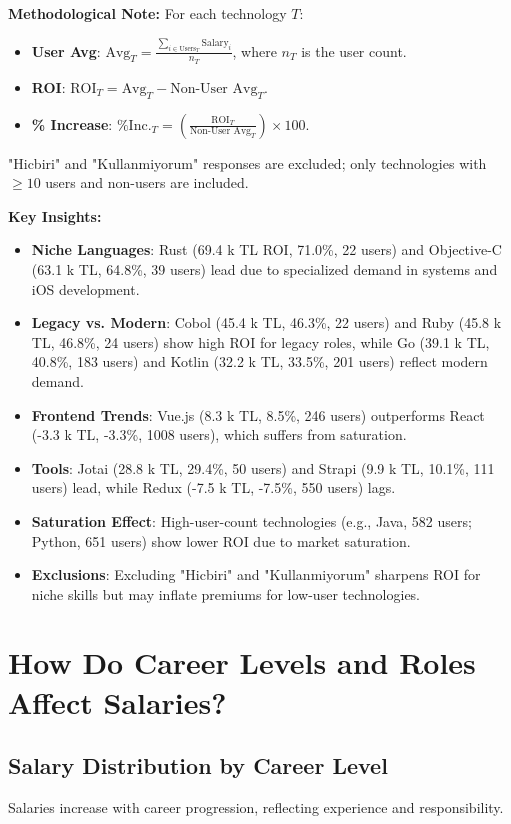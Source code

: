 \documentclass[12pt,a4paper]{article}
\begin{document}
\textbf{Methodological Note:}
For each technology \( T \):
\begin{itemize}
	\item \textbf{User Avg}: \( \text{Avg}_T = \frac{\sum_{i \in \text{Users}_T} \text{Salary}_i}{n_T} \), where \( n_T \) is the user count.
	\item \textbf{ROI}: \( \text{ROI}_T = \text{Avg}_T - \text{Non-User Avg}_T \).
	\item \textbf{\% Increase}: \( \text{\% Inc.}_T = \left( \frac{\text{ROI}_T}{\text{Non-User Avg}_T} \right) \times 100 \).
\end{itemize}
"Hicbiri" and "Kullanmiyorum" responses are excluded; only technologies with \(\geq 10\) users and non-users are included.

\textbf{Key Insights:}
\begin{itemize}
	\item \textbf{Niche Languages}: Rust (69.4 k TL ROI, 71.0\%, 22 users) and Objective-C (63.1 k TL, 64.8\%, 39 users) lead due to specialized demand in systems and iOS development.
	\item \textbf{Legacy vs. Modern}: Cobol (45.4 k TL, 46.3\%, 22 users) and Ruby (45.8 k TL, 46.8\%, 24 users) show high ROI for legacy roles, while Go (39.1 k TL, 40.8\%, 183 users) and Kotlin (32.2 k TL, 33.5\%, 201 users) reflect modern demand.
	\item \textbf{Frontend Trends}: Vue.js (8.3 k TL, 8.5\%, 246 users) outperforms React (-3.3 k TL, -3.3\%, 1008 users), which suffers from saturation.
	\item \textbf{Tools}: Jotai (28.8 k TL, 29.4\%, 50 users) and Strapi (9.9 k TL, 10.1\%, 111 users) lead, while Redux (-7.5 k TL, -7.5\%, 550 users) lags.
	\item \textbf{Saturation Effect}: High-user-count technologies (e.g., Java, 582 users; Python, 651 users) show lower ROI due to market saturation.
	\item \textbf{Exclusions}: Excluding "Hicbiri" and "Kullanmiyorum" sharpens ROI for niche skills but may inflate premiums for low-user technologies.
\end{itemize}

\section{How Do Career Levels and Roles Affect Salaries?}

\subsection{Salary Distribution by Career Level}
Salaries increase with career progression, reflecting experience and responsibility.
\end{document}
